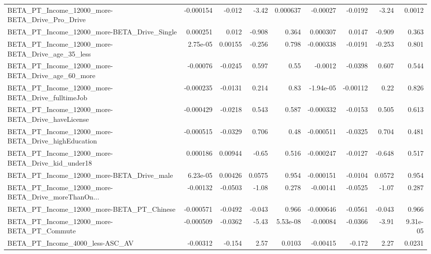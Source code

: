 \begin{tabular}{lrrrrrrrr}
BETA\_PT\_Income\_12000\_more-BETA\_Drive\_Pro\_Drive     &   -0.000154 &       -0.012 &    -3.42 & 0.000637 &   -0.00027 &     -0.0192 &        -3.24 &        0.0012 \\
BETA\_PT\_Income\_12000\_more-BETA\_Drive\_Single        &    0.000251 &        0.012 &   -0.908 &    0.364 &   0.000307 &      0.0147 &       -0.909 &         0.363 \\
BETA\_PT\_Income\_12000\_more-BETA\_Drive\_age\_35\_less   &    2.75e-05 &      0.00155 &   -0.256 &    0.798 &  -0.000338 &     -0.0191 &       -0.253 &         0.801 \\
BETA\_PT\_Income\_12000\_more-BETA\_Drive\_age\_60\_more   &    -0.00076 &      -0.0245 &    0.597 &     0.55 &    -0.0012 &     -0.0398 &        0.607 &         0.544 \\
BETA\_PT\_Income\_12000\_more-BETA\_Drive\_fulltimeJob   &   -0.000235 &      -0.0131 &    0.214 &     0.83 &  -1.94e-05 &    -0.00112 &         0.22 &         0.826 \\
BETA\_PT\_Income\_12000\_more-BETA\_Drive\_haveLicense   &   -0.000429 &      -0.0218 &    0.543 &    0.587 &  -0.000332 &     -0.0153 &        0.505 &         0.613 \\
BETA\_PT\_Income\_12000\_more-BETA\_Drive\_highEducation &   -0.000515 &      -0.0329 &    0.706 &     0.48 &  -0.000511 &     -0.0325 &        0.704 &         0.481 \\
BETA\_PT\_Income\_12000\_more-BETA\_Drive\_kid\_under18   &    0.000186 &      0.00944 &    -0.65 &    0.516 &  -0.000247 &     -0.0127 &       -0.648 &         0.517 \\
BETA\_PT\_Income\_12000\_more-BETA\_Drive\_male          &    6.23e-05 &      0.00426 &   0.0575 &    0.954 &  -0.000151 &     -0.0104 &       0.0572 &         0.954 \\
BETA\_PT\_Income\_12000\_more-BETA\_Drive\_moreThanOn... &    -0.00132 &      -0.0503 &    -1.08 &    0.278 &   -0.00141 &     -0.0525 &        -1.07 &         0.287 \\
BETA\_PT\_Income\_12000\_more-BETA\_PT\_Chinese          &   -0.000571 &      -0.0492 &   -0.043 &    0.966 &  -0.000646 &     -0.0561 &       -0.043 &         0.966 \\
BETA\_PT\_Income\_12000\_more-BETA\_PT\_Commute          &   -0.000509 &      -0.0362 &    -5.43 & 5.53e-08 &   -0.00084 &     -0.0366 &        -3.91 &      9.31e-05 \\
BETA\_PT\_Income\_4000\_less-ASC\_AV                    &    -0.00312 &       -0.154 &     2.57 &   0.0103 &   -0.00415 &      -0.172 &         2.27 &        0.0231 \\

\end{tabular}
